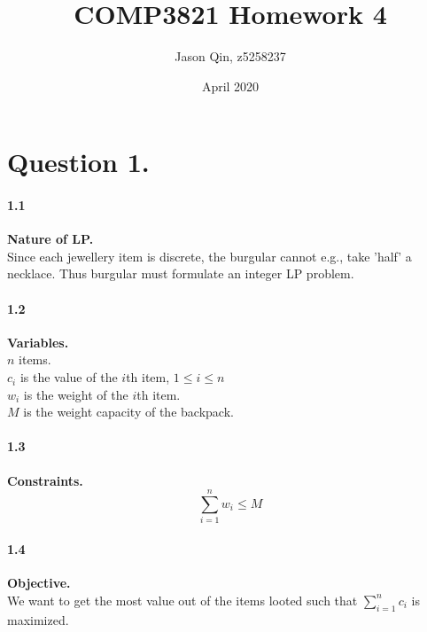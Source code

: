\documentclass{article}
\title{COMP3821 Homework 4}
\author{Jason Qin, z5258237}
\date{April 2020}
\begin{document}
\maketitle

\section*{Question 1.}
\paragraph{1.1} \textbf{Nature of LP.} \\

\noindent
Since each jewellery item is discrete, the burgular cannot e.g., take 'half' a necklace.
Thus burgular must formulate an integer LP problem.

\paragraph{1.2} \textbf{Variables.} \\

\noindent
$n$ items.\\
$c_i$ is the value of the $i$th item, $1 \leq i \leq n$ \\
$w_i$ is the weight of the $i$th item. \\
$M$ is the weight capacity of the backpack.

\paragraph{1.3} \textbf{Constraints.} \\

\noindent
$$\sum_{i=1}^{n} w_i \leq M$$

\paragraph*{1.4} \textbf{Objective.} \\

\noindent
We want to get the most value out of the items looted such that
$\sum_{i=1}^{n} c_i$ is maximized.
\end{document}
